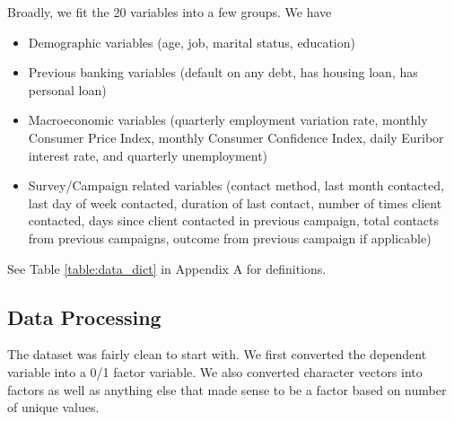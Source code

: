 \documentclass[12pt]{article}
\begin{document}
Broadly, we fit the 20 variables into a few groups. We have 
\begin{itemize}
    \item Demographic variables (age, job, marital status, education) 
    \item Previous banking variables (default on any debt, has housing loan, has personal loan)
    \item Macroeconomic variables (quarterly employment variation rate, monthly Consumer Price Index, monthly Consumer Confidence Index, daily Euribor interest rate, and quarterly unemployment)
    \item Survey/Campaign related variables (contact method, last month contacted, last day of week contacted, duration of last contact, number of times client contacted, days since client contacted in previous campaign, total contacts from previous campaigns, outcome from previous campaign if applicable)
\end{itemize}

See Table \ref{table:data_dict} in Appendix A for definitions. 

\subsection*{Data Processing}
The dataset was fairly clean to start with. We first converted the dependent variable into a 0/1 factor variable. We also converted character vectors into factors as well as anything else that made sense to be a factor based on number of unique values. 
\end{document}
